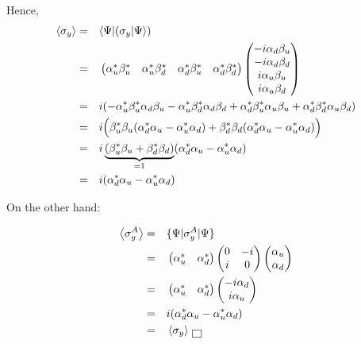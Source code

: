 \documentclass[solutions.tex]{subfiles}
\begin{document}
Hence,
\begin{equation*}\begin{aligned}
	\left\langle \sigma_y \right\rangle &=&& \langle \Psi|(\sigma_y|\Psi\rangle) \\
	~ &=&& \begin{pmatrix}
		\alpha_u^*\beta_u^* & \alpha_u^*\beta_d^* &
		\alpha_d^*\beta_u^* & \alpha_d^*\beta_d^* \\
	\end{pmatrix}\begin{pmatrix}
		-i\alpha_d\beta_u \\
		-i\alpha_d\beta_d \\
		i\alpha_u\beta_u\\
		i\alpha_u\beta_d \\
	\end{pmatrix} \\
	~ &=&& i(-\alpha_u^*\beta_u^*\alpha_d\beta_u -
		\alpha_u^*\beta_d^*\alpha_d\beta_d +
		\alpha_d^*\beta_u^*\alpha_u\beta_u +
		\alpha_d^*\beta_d^*\alpha_u\beta_d) \\
	~ &=&& i\Bigl(\beta_u^*\beta_u(
		\alpha_d^*\alpha_u - \alpha_u^*\alpha_d
	)+\beta_d^*\beta_d(
		\alpha_d^*\alpha_u - \alpha_u^*\alpha_d
	)\Bigr) \\
	~ &=&& i
	\underbrace{(\beta_u^*\beta_u + \beta_d^*\beta_d)}_{=1}
	(\alpha_d^*\alpha_u - \alpha_u^*\alpha_d) \\
	~ &=&& i(\alpha_d^*\alpha_u - \alpha_u^*\alpha_d) \\
\end{aligned}\end{equation*}

On the other hand:

\begin{equation*}\begin{aligned}
	\left\langle \sigma_y^A \right\rangle &=&& \{\Psi|\sigma_y^A|\Psi\} \\
	~ &=&& \begin{pmatrix} \alpha_u^* & \alpha_d^* \\ \end{pmatrix}
		\begin{pmatrix}
			0 & -i \\
			i & 0 \\
		\end{pmatrix}\begin{pmatrix}
			\alpha_u \\
			\alpha_d \\
		\end{pmatrix} \\
	~ &=&& \begin{pmatrix} \alpha_u^* & \alpha_d^* \\ \end{pmatrix}
		\begin{pmatrix}
			-i\alpha_d \\
			i\alpha_u \\
		\end{pmatrix} \\
	~ &=&& i(\alpha_d^*\alpha_u - \alpha_u^*\alpha_d) \\
	~ &=&& \left\langle \sigma_y \right\rangle \,\boxed{\,}
\end{aligned}\end{equation*}
\end{document}
